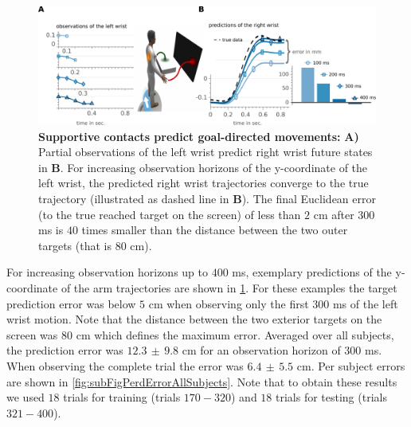 \begin{figure}[t]
\centering
\includegraphics[width=\textwidth]{Elmar/picsClean/Fig3Predictions}
 \caption{\textbf{Supportive contacts predict goal-directed movements:} 
 \textbf{A)} Partial observations of the left wrist predict right wrist future states in \textbf{B}. 
 For increasing observation horizons of the y-coordinate of the left wrist, 
 the predicted right wrist trajectories converge to the true trajectory (illustrated as dashed line in \textbf{B}). 
 The final Euclidean error (to the true reached target on the screen) of less than $2$ cm after $300$ ms is $40$ times smaller than the distance between the two outer targets (that is $80$ cm). 
}
\label{fig:OpsPrediction}
\end{figure}

For increasing observation horizons up to $400$ ms, exemplary predictions of the 
y-coordinate of the arm trajectories are shown in \FigureAbbr 
\ref{fig:OpsPrediction}. For these examples the target prediction error was 
below $5$ cm when observing only the first $300$ ms of the left wrist motion. 
Note that the distance between the two exterior targets on the screen was $80$ 
cm which defines the maximum error.  Averaged over all subjects, the prediction 
error was $12.3 \, \pm \, 9.8$ cm for an observation horizon of $300$ ms. When 
observing the complete trial the error was $6.4 \, \pm \, 5.5$ cm. Per subject errors are shown in \FigureAbbr 
\ref{fig:subFigPerdErrorAllSubjects}. Note that to obtain these results 
we used $18$ trials for training (trials $170-320$) and $18$ trials for testing (trials $321-400$). %

